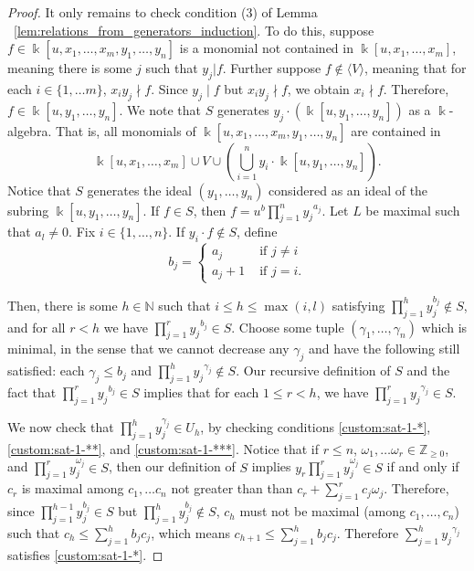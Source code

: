 \documentclass{amsart}
\theoremstyle{plain}
\theoremstyle{definition}
\theoremstyle{remark}
\numberwithin{equation}{section}
\newcommand\BN{{\mathbb N}}
\newcommand\Bk{{\Bbbk}}
\newcommand{\halfcan}{L}
\begin{document}
\begin{proof}
It only remains to check condition (3) of Lemma ~\ref{lem:relations_from_generators_induction}. To do this, suppose $f\in \Bk[u, x_1, \ldots, x_m, y_1, \ldots, y_n]$ is a monomial not contained in $\Bk[u, x_1, \ldots, x_m]$, meaning there is some $j$ such that $y_j|f$.  Further suppose $f\not\in \langle V \rangle$, meaning that for each $i\in \{1, \ldots m\}$, $x_iy_j \nmid f$. Since $y_j \mid f$ but $x_iy_j \nmid f$, we obtain $x_i\nmid f$.  Therefore, $f\in \Bk[u, y_1, \ldots, y_n]$.  We note that $S$ generates $y_j \cdot (\Bk[u,y_1, \ldots, y_n])$ as a $\Bk$-algebra.  That is, all monomials of $\Bk[u, x_1, \ldots, x_m, y_1, \ldots, y_n]$ are contained in
\[
	\Bk[u, x_1, \ldots, x_m] \cup V \cup \left(\bigcup_{i=1}^n y_i \cdot \Bk[u, y_1, \ldots, y_n]\right). 
\]
Notice that $S$ generates the ideal $(y_1, \ldots, y_n)$ considered as an ideal of the subring $\Bk[u, y_1, \ldots, y_n]$.  If $f\in S$, then $f=u^b \prod_{j=1}^n {y_j}^{a_j}$. Let $\halfcan$ be maximal such that $a_l\ne 0$.
Fix $i \in \{1, \ldots, n\}$. If $y_i \cdot f \notin S$, define
\[
b_j = \begin{cases}
	a_j &\text{ if } j \neq i\\
	a_j + 1 &\text{ if } j=i.
\end{cases}
\]

\noindent
Then, there is some $h \in \BN$ such that $i \le h \le \max(i, l)$ satisfying $\prod_{j = 1}^h y_j^{b_j}\not\in S$, 
and for all $r<h$ we have $\prod_{j=1}^r {y_j}^{b_j}\in S$.  
Choose some tuple $(\gamma_1, \ldots, \gamma_n)$ which is minimal, in the sense that we cannot decrease any $\gamma_j$ 
and have the following still satisfied: each $\gamma_j\le b_j$ 
and $\prod_{j=1}^h {y_j}^{\gamma_j}\not\in S.$ Our recursive definition of 
$S$ and the fact that $\prod_{j=1}^r {y_j}^{b_j}\in S$ implies that for each $1\le r< h$, we have $\prod_{j=1}^r {y_j}^{\gamma_j}\in S$.

We now check that $\prod_{j=1}^h y_j^{\gamma_j}\in U_{h}$, by checking conditions \ref{custom:sat-1-*}, \ref{custom:sat-1-**}, and \ref{custom:sat-1-***}.  
Notice that if $r\le n$, $\omega_1, \ldots \omega_r\in \mathbb{Z}_{\ge 0}$, and $\prod_{j=1}^r y_j^{\omega_j}\in S$, then our definition of $S$ implies $y_r\prod_{j=1}^r y_j^{\omega_j}\in S$ if and only if $c_r$ is maximal among $c_1, \ldots c_n$ not greater than than $c_r + \sum_{j=1}^r c_j \omega_j$.
Therefore, since $\prod_{j=1}^{h-1} y_j^{b_j}\in S$ but $\prod_{j=1}^h y_j^{b_j}\not\in S$, $c_h$ must not be maximal (among $c_1, \ldots, c_n$) such that $c_h \le \sum_{j=1}^h b_jc_j$, which means $c_{h+1}\le \sum_{j=1}^h b_jc_j$.  Therefore $\sum_{j=1}^h {y_j}^{\gamma_j}$ satisfies \ref{custom:sat-1-*}.  


\end{proof}
\end{document}
